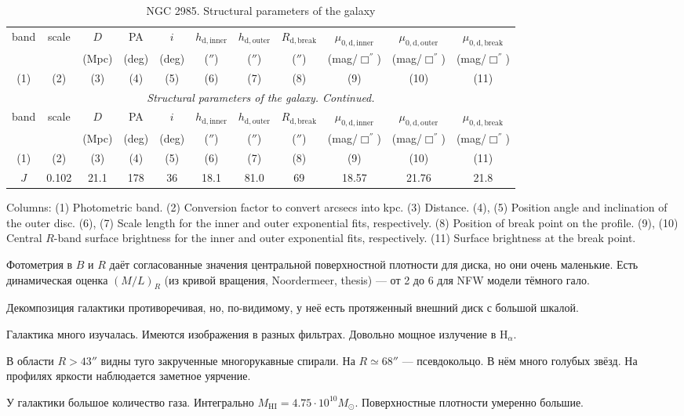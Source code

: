 \documentclass[english,10pt]{article}
\def\mm{\mathrm}
\begin{document}
\begin{longtable}[c]{ccccccccccc}
\caption{NGC 2985. Structural parameters of the galaxy} \\ 
\hline 
band & scale & $D$   & PA    & $i$ &
$h_\mm{d,inner}$ & $h_\mm{d,outer}$ & $R_\mm{d,break}$ &
$\mu_\mm{0,d,inner}$ & $\mu_\mm{0,d,outer}$ & $\mu_\mm{0,d,break}$ \\ 
     &       & (Mpc) & (deg) & (deg) &
($''$)           & ($''$)           & ($''$)           & 
(mag/$\Box^{''}$)    & (mag/$\Box^{''}$)    & (mag/$\Box^{''}$) \\
(1)&(2)&(3)&(4)&(5)&(6)&(7)&(8)&(9)&(10)&(11) \\ 
\hline
\endfirsthead 
\hline
\multicolumn{11}{c}{\small\slshape Structural parameters of the galaxy. 
Continued. } \\ \hline
band & scale & $D$   & PA    & $i$ &
$h_\mm{d,inner}$ & $h_\mm{d,outer}$ & $R_\mm{d,break}$ &
$\mu_\mm{0,d,inner}$ & $\mu_\mm{0,d,outer}$ & $\mu_\mm{0,d,break}$ \\ 
     &       & (Mpc) & (deg) & (deg) &
($''$)           & ($''$)           & ($''$)           & 
(mag/$\Box^{''}$)    & (mag/$\Box^{''}$)    & (mag/$\Box^{''}$) \\
(1)&(2)&(3)&(4)&(5)&(6)&(7)&(8)&(9)&(10)&(11) \\
\hline
\endhead 
\hline
$J$ & 0.102 & 21.1 & 178 & 36 & 
18.1 & 81.0 & 69 & 
18.57 & 21.76 & 21.8 \tabularnewline
\hline
\end{longtable}

Columns: 
(1) Photometric band. 
(2) Conversion factor to convert arcsecs into kpc.
(3) Distance.
(4), (5) Position angle and inclination of the outer disc.
(6), (7) Scale length for the inner and outer exponential fits, 
respectively. 
(8) Position of break point on the profile. 
(9), (10) Central $R$-band surface brightness 
for the inner and outer exponential fits, respectively. 
(11) Surface brightness at the break point.

\bigskip
\noindent
Фотометрия в $B$ и $R$ даёт согласованные значения центральной 
поверхностной плотности для диска, но они очень маленькие. Есть 
динамическая оценка $(M/L)_R$ 
(из кривой вращения, Noordermeer, thesis) --- от 2 до 6 для NFW 
модели тёмного гало.

\bigskip
\noindent
Декомпозиция галактики противоречивая, но, по-видимому, у неё есть 
протяженный внешний диск с большой шкалой.

\bigskip
\noindent
Галактика много изучалась. Имеются изображения в разных фильтрах. 
Довольно мощное излучение в H$_\alpha$.

\bigskip
\noindent
В области $R > 43''$ видны туго закрученные многорукавные спирали. 
На $R \simeq 68''$ --- псевдокольцо. В нём много голубых звёзд. 
На профилях яркости наблюдается заметное уярчение.

\bigskip
\noindent
У галактики большое количество газа. Интегрально $M_\mm{HI} = 4.75 \cdot 
10^{10} M_\odot$. Поверхностные плотности умеренно большие.
\end{document}
